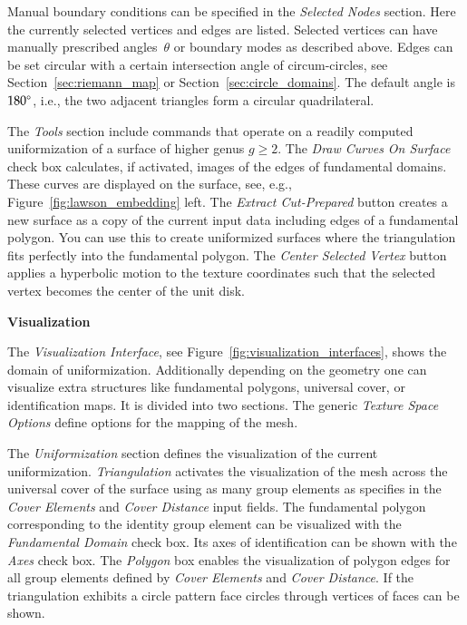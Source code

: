 \documentclass[Thesis.tex]{subfiles}
\begin{document}
Manual boundary conditions can be specified in the \emph{Selected Nodes} section. 
Here the currently selected vertices and edges are listed. 
Selected vertices can have manually prescribed angles~$\theta$ or boundary modes as described above. 
Edges can be set circular with a certain intersection angle of circum-circles, see Section~\ref{sec:riemann_map} or Section~\ref{sec:circle_domains}. 
The default angle is $180\degree$, i.e., the two adjacent triangles form a circular quadrilateral.

The \emph{Tools} section include commands that operate on a readily computed uniformization of a surface of higher genus $g\geq 2$. 
The \emph{Draw Curves On Surface} check box calculates, if activated, images of the edges of fundamental domains. 
These curves are displayed on the surface, see, e.g., Figure~\ref{fig:lawson_embedding} left. 
The \emph{Extract Cut-Prepared} button creates a new surface as a copy of the current input data including edges of a fundamental polygon. 
You can use this to create uniformized surfaces where the triangulation fits perfectly into the fundamental polygon. 
The \emph{Center Selected Vertex} button applies a hyperbolic motion to the texture coordinates such that the selected vertex becomes the center of the unit disk.

{\bf Visualization}

The \emph{Visualization Interface}, see Figure~\ref{fig:visualization_interfaces}, shows the domain of uniformization. 
Additionally depending on the geometry one can visualize extra structures like fundamental polygons, universal cover, or identification maps. 
It is divided into two sections. The generic \emph{Texture Space Options} define options for the mapping of the mesh. 

The \emph{Uniformization} section defines the visualization of the current uniformization. 
\emph{Triangulation} activates the visualization of the mesh across the universal cover of the surface using as many group elements as specifies in the \emph{Cover Elements} and \emph{Cover Distance} input fields. 
The fundamental polygon corresponding to the identity group element can be visualized with the \emph{Fundamental Domain} check box. Its axes of identification can be shown with the \emph{Axes} check box. 
The \emph{Polygon} box enables the visualization of polygon edges for all group elements defined by \emph{Cover Elements} and \emph{Cover Distance}. 
If the triangulation exhibits a circle pattern face circles through vertices of faces can be shown.
\end{document}

